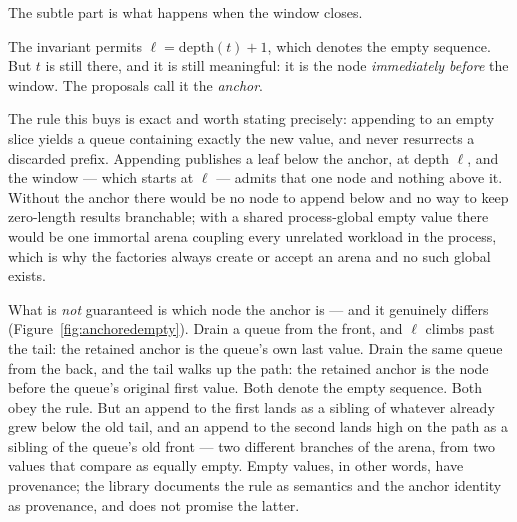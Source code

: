 \documentclass[11pt,twoside,openright]{book}
\newcommand{\term}[1]{\textit{#1}}
\begin{document}
The subtle part is what happens when the window closes.

The invariant permits $\ell = \mathrm{depth}(t) + 1$, which denotes the empty
sequence. But $t$ is still there, and it is still meaningful: it is the node
\emph{immediately before} the window. The proposals call it the
\term{anchor}.

The rule this buys is exact and worth stating precisely: appending to an empty
slice yields a queue containing exactly the new value, and never resurrects a
discarded prefix. Appending publishes a leaf below the anchor, at depth
$\ell$, and the window --- which starts at $\ell$ --- admits that one node and
nothing above it. Without the anchor there would be no node to append below and
no way to keep zero-length results branchable; with a shared process-global
empty value there would be one immortal arena coupling every unrelated workload
in the process, which is why the factories always create or accept an arena and
no such global exists.

What is \emph{not} guaranteed is which node the anchor is --- and it genuinely
differs (Figure~\ref{fig:anchoredempty}). Drain a queue from the front, and
$\ell$ climbs past the tail: the retained anchor is the queue's own last value.
Drain the same queue from the back, and the tail walks up the path: the retained
anchor is the node before the queue's original first value. Both denote the
empty sequence. Both obey the rule. But an append to the first lands as a
sibling of whatever already grew below the old tail, and an append to the second
lands high on the path as a sibling of the queue's old front --- two different
branches of the arena, from two values that compare as equally empty. Empty
values, in other words, have provenance; the library documents the rule as
semantics and the anchor identity as provenance, and does not promise the
latter.
\end{document}
